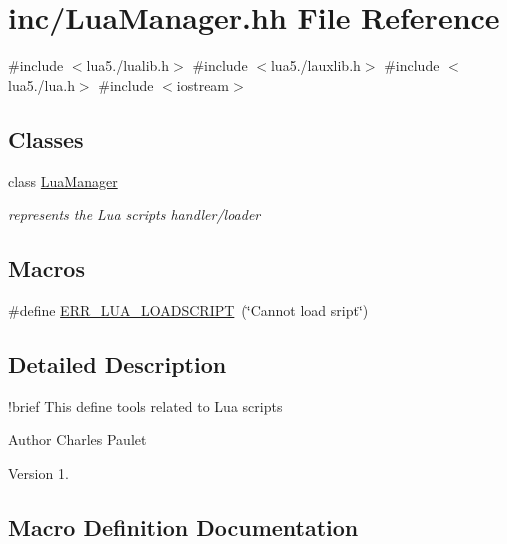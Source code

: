 \hypertarget{_lua_manager_8hh}{}\section{inc/\+Lua\+Manager.hh File Reference}
\label{_lua_manager_8hh}
{\ttfamily \#include $<$lua5./lualib.\+h$>$}\newline
{\ttfamily \#include $<$lua5./lauxlib.\+h$>$}\newline
{\ttfamily \#include $<$lua5./lua.\+h$>$}\newline
{\ttfamily \#include $<$iostream$>$}\newline
\subsection*{Classes}
\begin{DoxyCompactItemize}
\item 
class \hyperlink{class_lua_manager}{Lua\+Manager}
\begin{DoxyCompactList}\small\item\em represents the Lua scripts handler/loader \end{DoxyCompactList}\end{DoxyCompactItemize}
\subsection*{Macros}
\begin{DoxyCompactItemize}
\item 
\#define \hyperlink{_lua_manager_8hh_aeb2cd7cb1e27ba04033691e5202776a2}{E\+R\+R\+\_\+\+L\+U\+A\+\_\+\+L\+O\+A\+D\+S\+C\+R\+I\+PT}~(\char`\"{}Cannot load sript\char`\"{})
\end{DoxyCompactItemize}


\subsection{Detailed Description}
!brief This define tools related to Lua scripts \begin{DoxyAuthor}{Author}
Charles Paulet 
\end{DoxyAuthor}
\begin{DoxyVersion}{Version}
1. 
\end{DoxyVersion}


\subsection{Macro Definition Documentation}
\mbox{\label{_lua_manager_8hh_aeb2cd7cb1e27ba04033691e5202776a2}} 
